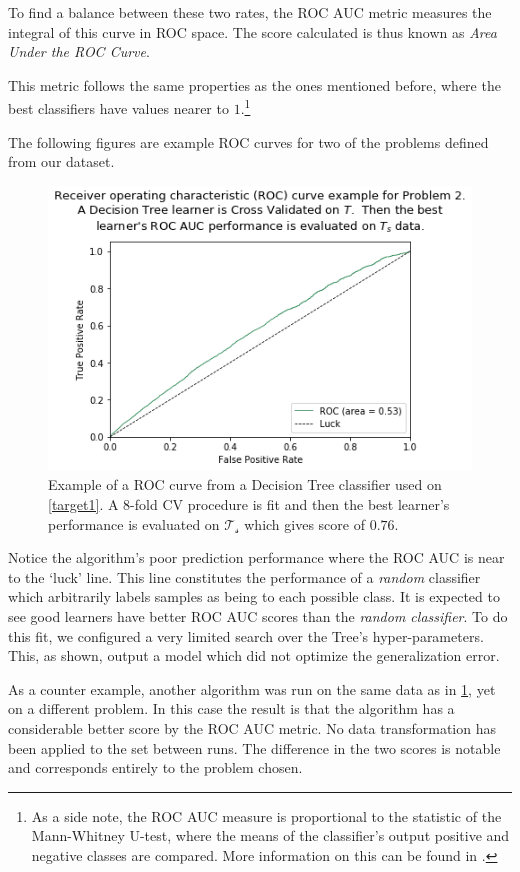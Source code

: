 To find a balance between these two rates, the ROC AUC metric measures the integral of this curve in ROC space.
The score calculated is thus known as \textit{Area Under the ROC Curve}.

This metric follows the same properties as the ones mentioned before, where the best classifiers have values nearer to $1$.\footnote{As a side note, the ROC AUC measure is proportional to the statistic of the Mann-Whitney U-test, where the means of the classifier's output positive and negative classes are compared.
More information on this can be found in \textcite{mason-rocAucRelationship}.}

The following figures are example ROC curves for two of the problems defined from our dataset.

\begin{figure}[h!]
\begin{center}
\includegraphics[width=0.7\columnwidth]{figures/figure-lowROCAUC/figure-lowROCAUC_original}
\caption{Example of a ROC curve from a Decision Tree classifier used on \cref{target1}. A 8-fold CV procedure is fit and then the best learner's performance is evaluated on $\mathcal{T_s}$ which gives score of $0.76$.}
\label{fg:lowROCAUC}
\end{center}
\end{figure}

Notice the algorithm's poor prediction performance where the ROC AUC is near to the `luck' line.
This line constitutes the performance of a \textit{random} classifier which arbitrarily labels samples as being to each possible class.
It is expected to see good learners have better ROC AUC scores than the \textit{random classifier}.
To do this fit, we configured a very limited search over the Tree's hyper-parameters.
This, as shown, output a model which did not optimize the generalization error. 


As a counter example, another algorithm was run on the same data as in \cref{fg:lowROCAUC}, yet on a different problem.
In this case the result is that the algorithm has a considerable better score by the ROC AUC metric.
No data transformation has been applied to the set between runs.
The difference in the two scores is notable and corresponds entirely to the problem chosen.

